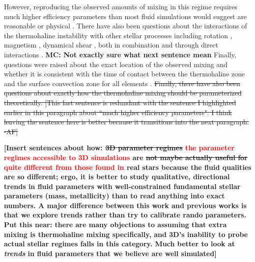 However, reproducing the observed amounts of mixing in this regime requires much higher efficiency parameters than most fluid simulations would suggest are reasonable or physical %
\citep{Denissenkov2010thermohaline, denissenkov_merryfield_2011, traxler_etal_2011, brown_etal_2013}. There have also been questions about the interactions of the thermohaline instability with other stellar processes
including rotation \citep{Lagarde2011}, magnetism \citep{harrington}, 
dynamical shear \citep{CantielloLanger2010}, both in combination and through direct interactions \citep{Maeder2013, SenguptaGaraud2018,harrington}. 
\textbf{MC: Not exactly sure what next sentence mean}
Finally, questions were raised about the exact location of the observed mixing and whether it is consistent with the time of contact between the thermohaline zone and the surface convection zone for all elements \citep[see e.g.][]{Angelou2015, Henkel2017, TayarJoyce22}.
\sout{Finally, there have also been questions about exactly how the thermohaline mixing should be parameterized theoretically. 
[This last sentence is redundant with the sentence I highlighted earlier in this paragraph about ``much higher efficiency parameters". I think leaving the sentence here is better because it transitions into the next paragraph. -AF]}

%

\textbf{[Insert sentences about how:
\sout{3D parameter regimes} \textcolor{red}{the parameter regimes accessible to 3D simulations} are \sout{not maybe actually useful for} \textcolor{red}{quite different from those found in} real stars because the fluid qualities are so different; ergo, it is better to study qualitative, directional trends in fluid parameters with well-constrained fundamental stellar parameters (mass, metallicity) than to read anything into exact numbers. A major difference between this work and previous works is that we explore trends rather than try to calibrate rando parameters. Put this near: there are many objections to assuming that extra mixing is thermohaline mixing specifically, and 3D's inability to probe actual stellar regimes falls in this category. Much better to look at \textit{trends} in fluid parameters that we believe are well simulated]}

